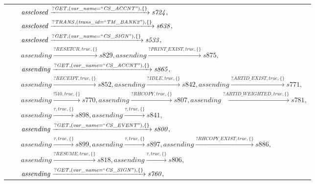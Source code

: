 \begin{tabular}{lcp{350px}}
& & $\mathit{assclosed}\xrightarrow{\mathit{?GET}, \mathit{(var\_name = ``CS\_ACCNT")}, \{\}}\mathit{s724},$ \\
& & $\mathit{assclosed}\xrightarrow{\mathit{?TRANS}, \mathit{(trans\_id = ``TM\_BANK2")}, \{\}}\mathit{s638},$ \\
& & $\mathit{assclosed}\xrightarrow{\mathit{?GET}, \mathit{(var\_name = ``CS\_SIGN")}, \{\}}\mathit{s533},$ \\
& & $\mathit{assending}\xrightarrow{\mathit{?RESETCR}, \mathit{true}, \{\}}\mathit{s829},\mathit{assending}\xrightarrow{\mathit{?PRINT\_EXIST}, \mathit{true}, \{\}}\mathit{s875},$ \\
& & $\mathit{assending}\xrightarrow{\mathit{?GET}, \mathit{(var\_name = ``CS\_ACCNT")}, \{\}}\mathit{s865},$ \\
& & $\mathit{assending}\xrightarrow{\mathit{?RECEIPT}, \mathit{true}, \{\}}\mathit{s852},\mathit{assending}\xrightarrow{\mathit{?IDLE}, \mathit{true}, \{\}}\mathit{s842},\mathit{assending}\xrightarrow{\mathit{?ARTID\_EXIST}, \mathit{true}, \{\}}\mathit{s771},$ \\
& & $\mathit{assending}\xrightarrow{\mathit{!510}, \mathit{true}, \{\}}\mathit{s770},\mathit{assending}\xrightarrow{\mathit{?RHCOPY}, \mathit{true}, \{\}}\mathit{s807},\mathit{assending}\xrightarrow{\mathit{?ARTID\_WEIGHTED}, \mathit{true}, \{\}}\mathit{s781},$ \\
& & $\mathit{assending}\xrightarrow{\mathit{\tau}, \mathit{true}, \{\}}\mathit{s898},\mathit{assending}\xrightarrow{\mathit{\tau}, \mathit{true}, \{\}}\mathit{s841},$ \\
& & $\mathit{assending}\xrightarrow{\mathit{?GET}, \mathit{(var\_name = ``CS\_EVENT")}, \{\}}\mathit{s800},$ \\
& & $\mathit{assending}\xrightarrow{\mathit{\tau}, \mathit{true}, \{\}}\mathit{s899},\mathit{assending}\xrightarrow{\mathit{\tau}, \mathit{true}, \{\}}\mathit{s897},\mathit{assending}\xrightarrow{\mathit{?RHCOPY\_EXIST}, \mathit{true}, \{\}}\mathit{s886},$ \\
& & $\mathit{assending}\xrightarrow{\mathit{?RESUME}, \mathit{true}, \{\}}\mathit{s818},\mathit{assending}\xrightarrow{\mathit{\tau}, \mathit{true}, \{\}}\mathit{s806},$ \\
& & $\mathit{assending}\xrightarrow{\mathit{?GET}, \mathit{(var\_name = ``CS\_SIGN")}, \{\}}\mathit{s760},$ \\
\end{tabular}

\begin{tabular}{lcp{350px}}
\end{tabular}

